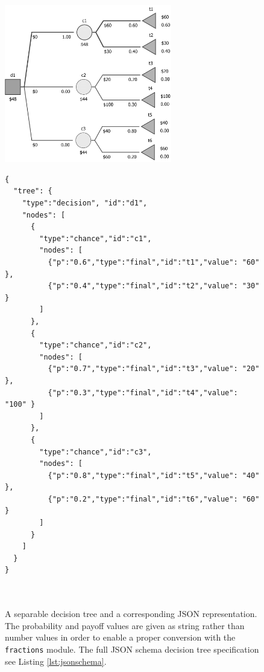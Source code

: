 \documentclass[a4paper,10pt,english]{sphinxmanual}
\begin{document}
	\begin{figure}
		\centering
		\includegraphics[width=0.65\textwidth]{case1.png}
\begin{lstlisting}[frame=single,label=lst:json1] 
{
  "tree": {
    "type":"decision", "id":"d1",
    "nodes": [
      { 
        "type":"chance","id":"c1",
        "nodes": [
          {"p":"0.6","type":"final","id":"t1","value": "60" },
          {"p":"0.4","type":"final","id":"t2","value": "30" }        
        ]             
      },
      { 
        "type":"chance","id":"c2",
        "nodes": [
          {"p":"0.7","type":"final","id":"t3","value": "20" },
          {"p":"0.3","type":"final","id":"t4","value": "100" }        
        ]             
      },
      { 
        "type":"chance","id":"c3",
        "nodes": [
          {"p":"0.8","type":"final","id":"t5","value": "40" },
          {"p":"0.2","type":"final","id":"t6","value": "60" }             
        ]
      }     
    ]
  }
}



\end{lstlisting}
		\caption{A separable decision tree and a corresponding JSON representation. The probability and payoff values are given as string rather than number values in order to enable a proper conversion with the \texttt{fractions} module. The full JSON schema decision tree specification see Listing \ref{lst:jsonschema}.}
		\label{fig:json1}
\end{figure}
\end{document}
